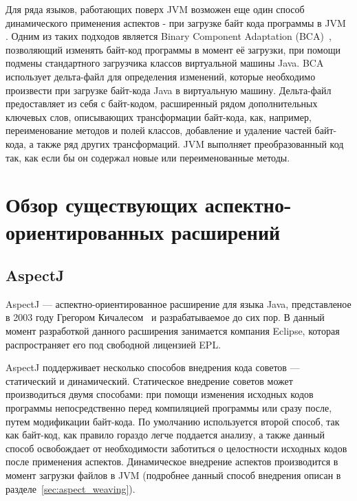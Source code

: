 Для ряда языков, работающих поверх JVM возможен еще один способ динамического
применения аспектов - при загрузке байт кода программы в JVM~
\cite{aspect_dynamic_weavers_in_oop}.
Одним из таких подходов является Binary Component Adaptation (BCA)~\cite{bca},
позволяющий изменять байт-код программы в момент её загрузки, при помощи
подмены стандартного загрузчика классов виртуальной машины Java.
BCA использует дельта-файл для определения изменений, которые необходимо
произвести при загрузке байт-кода Java в виртуальную машину.
Дельта-файл предоставляет из себя с байт-кодом, расширенный рядом дополнительных
ключевых слов, описывающих трансформации байт-кода, как, например,
переименование методов и полей классов, добавление и удаление частей байт-кода,
а также ряд других трансформаций.
JVM выполняет преобразованный код так, как если бы он содержал новые или
переименованные методы.


\section{Обзор существующих аспектно-ориентированных расширений}
\subsection{AspectJ}
\label{sub:aspectj_overwiev}

AspectJ --- аспектно-ориентированное расширение для языка Java, представленое в
2003 году Грегором Кичалесом~\cite{kiczales_aspectj} и разрабатываемое до сих
пор.
В данный момент разработкой данного расширения занимается компания Eclipse,
которая распространяет его под свободной лицензией EPL.

AspectJ поддерживает несколько способов внедрения кода советов --- статический и
динамический.
Статическое внедрение советов может производиться двумя способами: при помощи
изменения исходных кодов программы непосредственно перед компиляцией программы
или сразу после, путем модификации байт-кода.
По умолчанию используется второй способ, так как байт-код, как правило гораздо
легче поддается анализу, а также данный способ освобождает от необходимости
заботиться о целостности исходных кодов после применения аспектов.
Динамическое внедрение аспектов производится в момент загрузки файлов в JVM
(подробнее данный способ внедрения описан в разделе~\ref{sec:aspect_weaving}).

